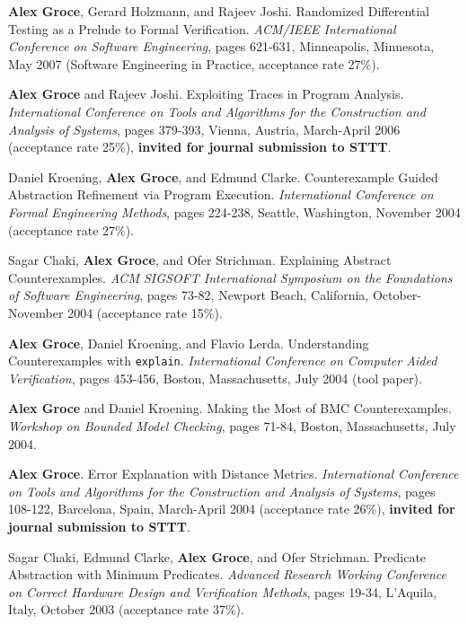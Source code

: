 \documentclass[ComputerScience]{vita}
\begin{document}
\begin{vita}
\begin{Refereed Conference and Workshop Publications}
\item
{\bf Alex Groce}, Gerard Holzmann, and Rajeev Joshi.
\newblock Randomized Differential Testing as a Prelude to Formal Verification.
\newblock \emph{ACM/IEEE International Conference on Software Engineering}, pages 621-631, Minneapolis, Minnesota, May 2007 (Software Engineering in Practice, acceptance rate 27\%).

\item
{\bf Alex Groce} and Rajeev Joshi.
\newblock Exploiting Traces in Program Analysis.
\newblock \emph{International Conference on Tools and Algorithms for the Construction and Analysis of Systems}, pages 379-393, Vienna, Austria, March-April 2006 (acceptance rate 25\%), {\bf invited for journal submission to STTT}.

\item
Daniel Kroening, {\bf Alex Groce}, and Edmund Clarke.
\newblock Counterexample Guided Abstraction Refinement via Program Execution.
\newblock \emph{International Conference on
   Formal Engineering Methods},  pages 224-238, Seattle, Washington, November 2004 (acceptance rate 27\%).

\item
Sagar Chaki, {\bf Alex Groce}, and Ofer Strichman.
\newblock Explaining Abstract Counterexamples.
\newblock \emph{ACM SIGSOFT International Symposium on the Foundations of Software Engineering},  pages 73-82, Newport Beach, California, October-November 2004 (acceptance rate 15\%).

\item
{\bf Alex Groce}, Daniel Kroening, and Flavio Lerda.
\newblock Understanding Counterexamples with {\tt explain}.
\newblock \emph{International Conference on Computer Aided Verification},  pages 453-456, Boston, Massachusetts, July 2004 (tool paper).

\item
{\bf Alex Groce} and Daniel Kroening.
\newblock Making the Most of BMC Counterexamples.
\newblock \emph{Workshop on Bounded Model Checking},  pages 71-84, Boston, Massachusetts, July 2004.


\item
{\bf Alex Groce}.
\newblock Error Explanation with Distance Metrics.
\newblock \emph{International Conference on Tools and Algorithms for the Construction and Analysis of Systems}, pages 108-122, Barcelona, Spain, March-April 2004 (acceptance rate 26\%), {\bf invited for journal submission to STTT}.

\item
Sagar Chaki, Edmund Clarke, {\bf Alex Groce}, and Ofer Strichman.
\newblock Predicate Abstraction with Minimum Predicates.
\newblock \emph{Advanced Research Working Conference on Correct Hardware Design and Verification Methods}, pages 19-34, L'Aquila, Italy, October 2003 (acceptance rate 37\%).


\end{Refereed Conference and Workshop Publications}
\end{vita}
\end{document}

